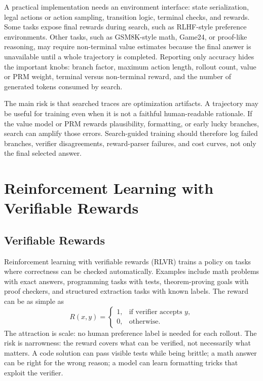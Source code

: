 A practical implementation needs an environment interface: state serialization, legal actions or action sampling, transition logic, terminal checks, and rewards. Some tasks expose final rewards during search, such as RLHF-style preference environments. Other tasks, such as GSM8K-style math, Game24, or proof-like reasoning, may require non-terminal value estimates because the final answer is unavailable until a whole trajectory is completed. Reporting only accuracy hides the important knobs: branch factor, maximum action length, rollout count, value or PRM weight, terminal versus non-terminal reward, and the number of generated tokens consumed by search.

The main risk is that searched traces are optimization artifacts. A trajectory may be useful for training even when it is not a faithful human-readable rationale. If the value model or PRM rewards plausibility, formatting, or early lucky branches, search can amplify those errors. Search-guided training should therefore log failed branches, verifier disagreements, reward-parser failures, and cost curves, not only the final selected answer.

\section{Reinforcement Learning with Verifiable Rewards}
\subsection{Verifiable Rewards}
Reinforcement learning with verifiable rewards (RLVR) trains a policy on tasks where correctness can be checked automatically. Examples include math problems with exact answers, programming tasks with tests, theorem-proving goals with proof checkers, and structured extraction tasks with known labels. The reward can be as simple as
\[
    R(x,y)
    =
    \begin{cases}
    1, & \text{if verifier accepts } y,\\
    0, & \text{otherwise.}
    \end{cases}
\]
The attraction is scale: no human preference label is needed for each rollout. The risk is narrowness: the reward covers what can be verified, not necessarily what matters. A code solution can pass visible tests while being brittle; a math answer can be right for the wrong reason; a model can learn formatting tricks that exploit the verifier.

